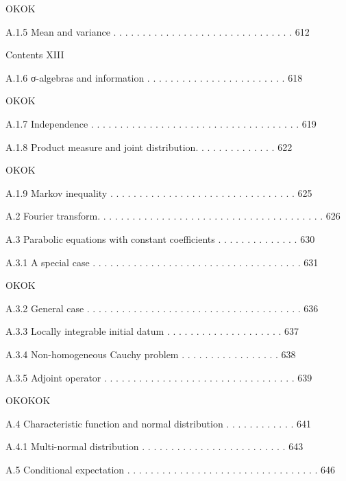 OKOK

A.1.5 Mean and variance . . . . . . . . . . . . . . . . . . . . . . . . . . . . . . . 612



Contents XIII



A.1.6 σ-algebras and information . . . . . . . . . . . . . . . . . . . . . . . . 618

OKOK

A.1.7 Independence . . . . . . . . . . . . . . . . . . . . . . . . . . . . . . . . . . . . 619



A.1.8 Product measure and joint distribution. . . . . . . . . . . . . . 622

OKOK

A.1.9 Markov inequality . . . . . . . . . . . . . . . . . . . . . . . . . . . . . . . . 625



A.2 Fourier transform. . . . . . . . . . . . . . . . . . . . . . . . . . . . . . . . . . . . . . . 626



A.3 Parabolic equations with constant coefficients . . . . . . . . . . . . . . 630



A.3.1 A special case . . . . . . . . . . . . . . . . . . . . . . . . . . . . . . . . . . . . 631

OKOK

A.3.2 General case . . . . . . . . . . . . . . . . . . . . . . . . . . . . . . . . . . . . . 636



A.3.3 Locally integrable initial datum . . . . . . . . . . . . . . . . . . . . 637



A.3.4 Non-homogeneous Cauchy problem . . . . . . . . . . . . . . . . . 638



A.3.5 Adjoint operator . . . . . . . . . . . . . . . . . . . . . . . . . . . . . . . . . 639

OKOKOK

A.4 Characteristic function and normal distribution . . . . . . . . . . . . 641



A.4.1 Multi-normal distribution . . . . . . . . . . . . . . . . . . . . . . . . . 643



A.5 Conditional expectation . . . . . . . . . . . . . . . . . . . . . . . . . . . . . . . . . 646



